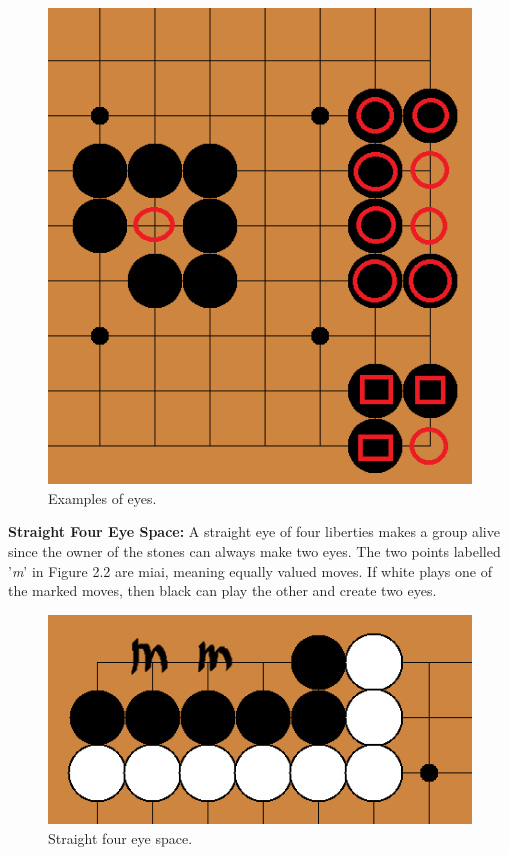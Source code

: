 \documentclass{l3proj}
\begin{document}
\begin{figure}[H]
\centering
\includegraphics[scale=0.5]{Images/eyes.png}
\caption{Examples of eyes.}
\end{figure}

\textbf{Straight Four Eye Space:} A straight eye of four liberties makes a group alive since the owner of the stones can always make two eyes. The two points labelled '\textit{m}' in Figure 2.2 are miai, meaning equally valued moves. If white plays one of the marked moves, then black can play the other and create two eyes.

\begin{figure}[H]
\centering
\includegraphics[scale=0.5]{Images/foureyespace.png}
\caption{Straight four eye space.}
\end{figure}
\end{document}
